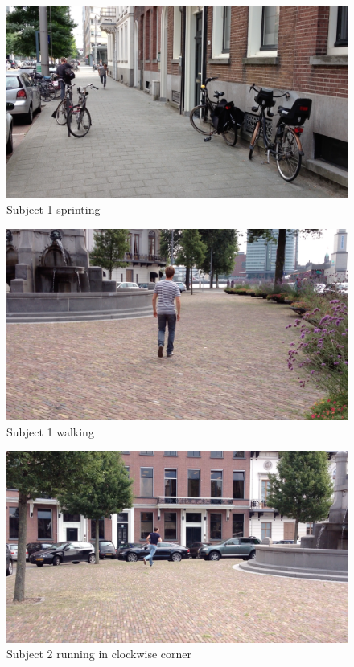 \begin{figure}
\centering
  \includegraphics[width=1\textwidth]{./Figures/chapter6/data_collection/stills/jos_sprint.png}
  \caption[Recording still 4]{Subject 1 sprinting}
\end{figure}

\begin{figure}
\centering
  \includegraphics[width=1\textwidth]{./Figures/chapter6/data_collection/stills/jos_walking.png}
  \caption[Recording still 5]{Subject 1 walking}
\end{figure}

\begin{figure}
\centering
  \includegraphics[width=1\textwidth]{./Figures/chapter6/data_collection/stills/roemer_run_cw.png}
  \caption[Recording still 6]{Subject 2 running in clockwise corner}
\end{figure}

